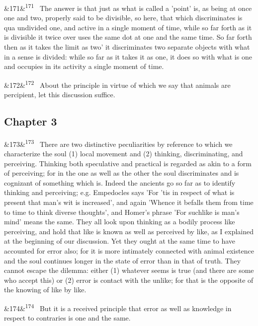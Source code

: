\documentclass[12pt]{article}
\newcommand{\para}[1][]{\par\noindent\ifx&#1&\else\textsuperscript{\footnotesize #1}~\fi}
\begin{document}
\para[171] The answer is that just as what is called a 'point' is, as being at once one and two, properly said to be divisible, so here, that which discriminates is qua undivided one, and active in a single moment of time, while so far forth as it is divisible it twice over uses the same dot at one and the same time. So far forth then as it takes the limit as two' it discriminates two separate objects with what in a sense is divided: while so far as it takes it as one, it does so with what is one and occupies in its activity a single moment of time.

\para[172] About the principle in virtue of which we say that animals are percipient, let this discussion suffice.

\subsection*{Chapter 3}

\para[173] There are two distinctive peculiarities by reference to which we characterize the soul (1) local movement and (2) thinking, discriminating, and perceiving. Thinking both speculative and practical is regarded as akin to a form of perceiving; for in the one as well as the other the soul discriminates and is cognizant of something which is. Indeed the ancients go so far as to identify thinking and perceiving; e.g. Empedocles says 'For 'tis in respect of what is present that man's wit is increased', and again 'Whence it befalls them from time to time to think diverse thoughts', and Homer's phrase 'For suchlike is man's mind' means the same. They all look upon thinking as a bodily process like perceiving, and hold that like is known as well as perceived by like, as I explained at the beginning of our discussion. Yet they ought at the same time to have accounted for error also; for it is more intimately connected with animal existence and the soul continues longer in the state of error than in that of truth. They cannot escape the dilemma: either (1) whatever seems is true (and there are some who accept this) or (2) error is contact with the unlike; for that is the opposite of the knowing of like by like.

\para[174] But it is a received principle that error as well as knowledge in respect to contraries is one and the same.
\end{document}
